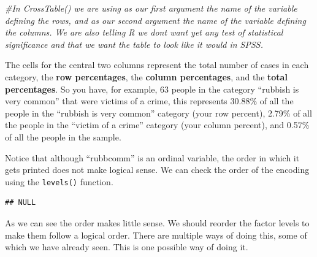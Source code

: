 \documentclass[
]{book}
\newenvironment{Shaded}{\begin{snugshade}}{\end{snugshade}}
\newcommand{\AttributeTok}[1]{\textcolor[rgb]{0.77,0.63,0.00}{#1}}
\newcommand{\CommentTok}[1]{\textcolor[rgb]{0.56,0.35,0.01}{\textit{#1}}}
\newcommand{\FunctionTok}[1]{\textcolor[rgb]{0.00,0.00,0.00}{#1}}
\newcommand{\NormalTok}[1]{#1}
\newcommand{\OtherTok}[1]{\textcolor[rgb]{0.56,0.35,0.01}{#1}}
\newcommand{\SpecialCharTok}[1]{\textcolor[rgb]{0.00,0.00,0.00}{#1}}
\newcommand{\StringTok}[1]{\textcolor[rgb]{0.31,0.60,0.02}{#1}}
\begin{document}
\begin{Shaded}
\begin{Highlighting}[]
\CommentTok{\#In CrossTable() we are using as our first argument the name of the variable defining the rows, and as our second argument the name of the variable defining the columns. We are also telling R we don\textquotesingle{}t want yet any test of statistical significance and that we want the table to look like it would in SPSS.}
\end{Highlighting}
\end{Shaded}

The cells for the central two columns represent the total number of cases in each category, the \textbf{row percentages}, the \textbf{column percentages}, and the \textbf{total percentages}. So you have, for example, 63 people in the category ``rubbish is very common'' that were victims of a crime, this represents 30.88\% of all the people in the ``rubbish is very common'' category (your row percent), 2.79\% of all the people in the ``victim of a crime'' category (your column percent), and 0.57\% of all the people in the sample.

Notice that although ``rubbcomm'' is an ordinal variable, the order in which it gets printed does not make logical sense. We can check the order of the encoding using the \texttt{levels()} function.

\begin{Shaded}
\end{Shaded}

\begin{verbatim}
## NULL
\end{verbatim}

As we can see the order makes little sense. We should reorder the factor levels to make them follow a logical order. There are multiple ways of doing this, some of which we have already seen. This is one possible way of doing it.

\begin{Shaded}
\end{Shaded}
\end{document}
